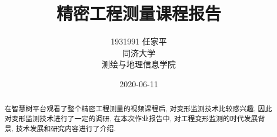 \documentclass[a4paper, UTF8, 12pt]{article}
\begin{document}
\title{\Huge 精密工程测量课程报告}
\author{\Large 
        1931991 任家平 \\[12pt]
        同济大学 \\[12pt]
        测绘与地理信息学院}
\date{2020-06-11}
\maketitle
\thispagestyle{empty}

\renewcommand\abstractname{\Large\textbf{摘要}}
\newpage
\begin{abstract}

    在智慧树平台观看了整个精密工程测量的视频课程后, 对变形监测技术比较感兴趣, 因此对变形监测技术进行了一定的调研, 在本次作业报告中, 对工程变形监测的时代发展背景, 技术发展和研究内容进行了介绍.

\end{abstract}
\thispagestyle{empty}

\newpage
{}
\tableofcontents

\newpage
{}





\newpage
\nocite{*}

\end{document}
